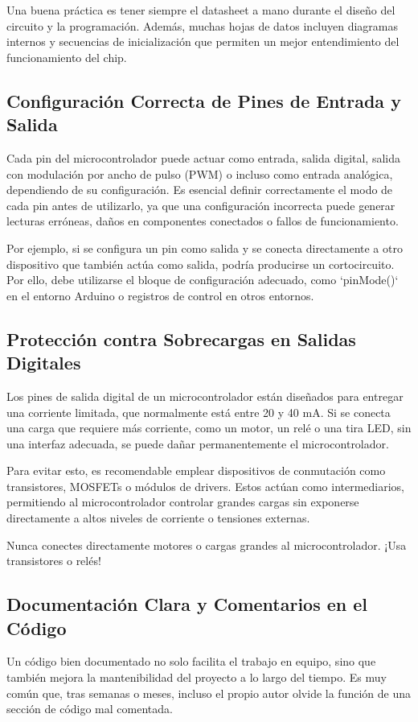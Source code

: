 \documentclass[a4paper,11pt]{article}
\begin{document}
Una buena pr\'actica es tener siempre el datasheet a mano durante el dise\~no del circuito y la programaci\'on. Adem\'as, muchas hojas de datos incluyen diagramas internos y secuencias de inicializaci\'on que permiten un mejor entendimiento del funcionamiento del chip.

\subsection{Configuraci\'on Correcta de Pines de Entrada y Salida}
Cada pin del microcontrolador puede actuar como entrada, salida digital, salida con modulación por ancho de pulso (PWM) o incluso como entrada anal\'ogica, dependiendo de su configuraci\'on. Es esencial definir correctamente el modo de cada pin antes de utilizarlo, ya que una configuraci\'on incorrecta puede generar lecturas err\'oneas, da\~nos en componentes conectados o fallos de funcionamiento.

Por ejemplo, si se configura un pin como salida y se conecta directamente a otro dispositivo que tambi\'en act\'ua como salida, podr\'ia producirse un cortocircuito. Por ello, debe utilizarse el bloque de configuraci\'on adecuado, como `pinMode()` en el entorno Arduino o registros de control en otros entornos.

\subsection{Protecci\'on contra Sobrecargas en Salidas Digitales}
Los pines de salida digital de un microcontrolador est\'an dise\~nados para entregar una corriente limitada, que normalmente est\'a entre 20 y 40 mA. Si se conecta una carga que requiere m\'as corriente, como un motor, un rel\'e o una tira LED, sin una interfaz adecuada, se puede da\~nar permanentemente el microcontrolador.

Para evitar esto, es recomendable emplear dispositivos de conmutaci\'on como transistores, MOSFETs o m\'odulos de drivers. Estos act\'uan como intermediarios, permitiendo al microcontrolador controlar grandes cargas sin exponerse directamente a altos niveles de corriente o tensiones externas.

\begin{tcolorbox}[tip,title=¡Atención!]
Nunca conectes directamente motores o cargas grandes al microcontrolador. ¡Usa transistores o relés!
\end{tcolorbox}

\subsection{Documentaci\'on Clara y Comentarios en el C\'odigo}
Un c\'odigo bien documentado no solo facilita el trabajo en equipo, sino que tambi\'en mejora la mantenibilidad del proyecto a lo largo del tiempo. Es muy com\'un que, tras semanas o meses, incluso el propio autor olvide la funci\'on de una secci\'on de c\'odigo mal comentada.
\end{document}
